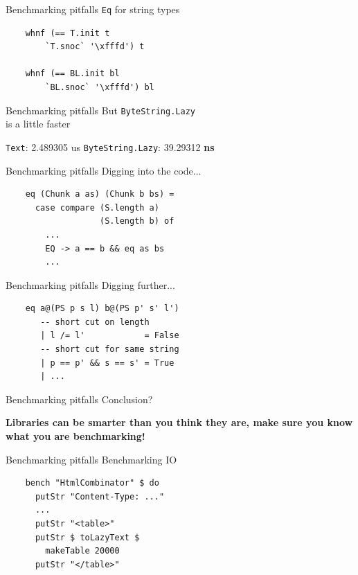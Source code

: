 \documentclass[20pt]{beamer}
\newcommand{\vspaced}{
    \vspace{5mm}
}
\begin{document}
\begin{frame}[fragile]{Benchmarking pitfalls}
    \texttt{Eq} for string types \\
    \vspaced
    \begin{lstlisting}
    whnf (== T.init t
        `T.snoc` '\xfffd') t

    whnf (== BL.init bl
        `BL.snoc` '\xfffd') bl
    \end{lstlisting}
\end{frame}

\begin{frame}{Benchmarking pitfalls}
    But \texttt{ByteString.Lazy} \\
    is a little faster \\
    \vspaced
    \texttt{Text}: 2.489305 us
    \texttt{ByteString.Lazy}: 39.29312 \textbf{ns}
\end{frame}

\begin{frame}[fragile]{Benchmarking pitfalls}
    Digging into the code... \\
    \vspaced
    \begin{lstlisting}
    eq (Chunk a as) (Chunk b bs) =
      case compare (S.length a)
                   (S.length b) of
        ...
        EQ -> a == b && eq as bs
        ...
    \end{lstlisting}
\end{frame}

\begin{frame}[fragile]{Benchmarking pitfalls}
    Digging further... \\
    \vspaced
    \begin{lstlisting}
    eq a@(PS p s l) b@(PS p' s' l')
       -- short cut on length
       | l /= l'            = False
       -- short cut for same string
       | p == p' && s == s' = True
       | ...
    \end{lstlisting}
\end{frame}

\begin{frame}{Benchmarking pitfalls}
    Conclusion? \\
    \vspaced
    \textbf{Libraries can be smarter than you think they are, make sure you know
    what you are benchmarking!}
\end{frame}

\begin{frame}[fragile]{Benchmarking pitfalls}
    Benchmarking IO \\
    \vspaced
    \begin{lstlisting}
    bench "HtmlCombinator" $ do
      putStr "Content-Type: ..."
      ...
      putStr "<table>"
      putStr $ toLazyText $
        makeTable 20000
      putStr "</table>"
    \end{lstlisting}
\end{frame}
\end{document}

